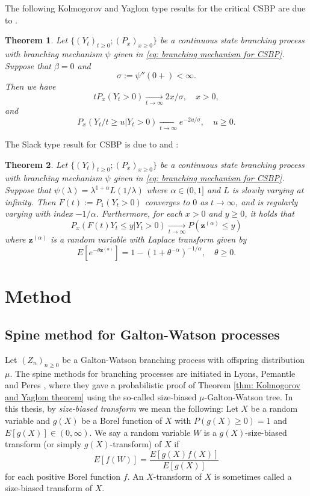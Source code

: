 \documentclass[UTF8]{pkuthss}
\theoremstyle{plain}
\newtheorem{thm}{Theorem}[section]
\theoremstyle{definition}
\numberwithin{equation}{section}
\begin{document}
	The following Kolmogorov and Yaglom type results for the critical CSBP are due to \cite{Li2000Asymptotic}.
\begin{thm}
	Let $\{(Y_t)_{t\geq 0}; (P_x)_{x\geq 0}\}$ be a continuous state branching process with branching mechanism $\psi$ given in \eqref{eq: branching mechanism for CSBP}. Suppose that $\beta = 0$ and 
\[
	\sigma := \psi''(0+) < \infty.
\]
	Then we have
\[
	t P_x(Y_t > 0) \xrightarrow[t\to \infty]{} 2x/\sigma, \quad x> 0,
\]
	and 
\[
	P_x( Y_t/t \geq u |Y_t>0) \xrightarrow[t\to \infty]{} e^{-2u/\sigma},\quad u\geq 0.
\]
\end{thm}
	The Slack type result for CSBP is due to \cite{KyprianouPardo2008Continuousstate} and \cite{RenYangZhao2014Conditional}:
\begin{thm}
	Let $\{(Y_t)_{t\geq 0}; (P_x)_{x\geq 0}\}$ be a continuous state branching process with branching mechanism $\psi$ given in \eqref{eq: branching mechanism for CSBP}. 
	Suppose that $\psi(\lambda)= \lambda^{1+\alpha}L(1/\lambda)$ where $\alpha \in (0,1]$ and $L$ is slowly varying at infinity. Then $F(t):= P_1(Y_t >0)$ converges to $0$ as $t\to \infty$, and is regularly varying with index $-1/\alpha$. Furthermore, for each $x>0$ and $y\geq 0$, it holds that
\[
	P_x(F(t)Y_t\leq y|Y_t>0) \xrightarrow[t\to \infty]{} P(\mathbf z^{(\alpha)}\leq y)
\]
	where $\mathbf z^{(\alpha)}$ is a random variable with Laplace transform given by
\[
	E[e^{-\theta \mathbf z^{(\alpha)}}] = 1-(1+\theta^{-\alpha})^{-1/\alpha},\quad \theta \geq0.
\]
\end{thm}

\section{Method}
\subsection{Spine method for Galton-Watson processes}
\label{sec: Methods}
	Let $(Z_n)_{n\geq 0}$ be a Galton-Watson branching process with offspring distribution $\mu$. The spine methods for branching processes are initiated in Lyons, Pemantle and Peres \cite{LyonsPemantlePeres1995Conceptual}, where they gave a probabilistic proof of Theorem \ref{thm: Kolmogorov and Yaglom theorem} using the so-called size-biased $\mu$-Galton-Watson tree.
In this thesis, by \emph{size-biased transform} we mean the following:
Let $X$ be a random variable
and $g(X)$ be a Borel function of $X$ with $P(g(X) \geq 0) = 1$ and $E[g(X)]\in (0,\infty)$.
We say a random variable $W$ is
a $g(X)$-size-biased transform (or simply $g(X)$-transform) of $X$ if
\[
E[f( W )]
= \frac{ E[g(X)f(X)]}{E[g(X)]}
\]
for each positive Borel function $f$.
An $X$-transform of $X$ is sometimes called a size-biased transform of $X$.
\end{document}

